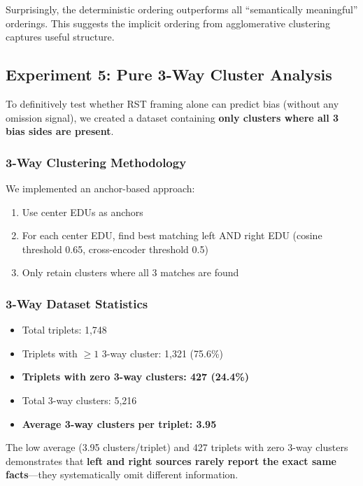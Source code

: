 \documentclass[11pt]{article}
\begin{document}
Surprisingly, the deterministic ordering outperforms all ``semantically meaningful'' orderings. This suggests the implicit ordering from agglomerative clustering captures useful structure.

\subsection{Experiment 5: Pure 3-Way Cluster Analysis}

To definitively test whether RST framing alone can predict bias (without any omission signal), we created a dataset containing \textbf{only clusters where all 3 bias sides are present}.

\subsubsection{3-Way Clustering Methodology}

We implemented an anchor-based approach:
\begin{enumerate}
    \item Use center EDUs as anchors
    \item For each center EDU, find best matching left AND right EDU (cosine threshold 0.65, cross-encoder threshold 0.5)
    \item Only retain clusters where all 3 matches are found
\end{enumerate}

\subsubsection{3-Way Dataset Statistics}

\begin{itemize}
    \item Total triplets: 1,748
    \item Triplets with $\geq 1$ 3-way cluster: 1,321 (75.6\%)
    \item \textbf{Triplets with zero 3-way clusters: 427 (24.4\%)}
    \item Total 3-way clusters: 5,216
    \item \textbf{Average 3-way clusters per triplet: 3.95}
\end{itemize}

The low average (3.95 clusters/triplet) and 427 triplets with zero 3-way clusters demonstrates that \textbf{left and right sources rarely report the exact same facts}---they systematically omit different information.
\end{document}
